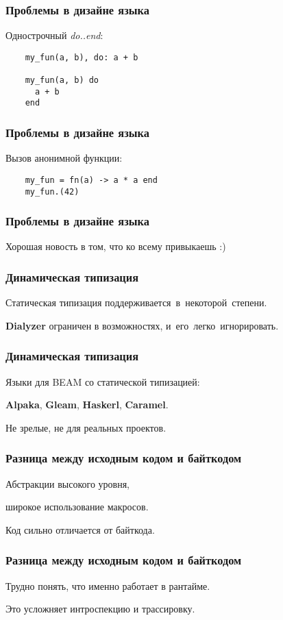 \documentclass[10pt,xcolor=x11names]{beamer}
\begin{document}
\begin{frame}[fragile]
  \frametitle{Проблемы в дизайне языка}
  Однострочный \textit{do..end}:
  \begin{lstlisting}
    my_fun(a, b), do: a + b
    
    my_fun(a, b) do
      a + b
    end
  \end{lstlisting}
\end{frame}

\begin{frame}[fragile]
  \frametitle{Проблемы в дизайне языка}
  Вызов анонимной функции:
  \begin{lstlisting}
    my_fun = fn(a) -> a * a end 
    my_fun.(42)
  \end{lstlisting}
\end{frame}

\begin{frame}
  \frametitle{Проблемы в дизайне языка}
  Хорошая новость в том, что ко всему привыкаешь :)
\end{frame}

\begin{frame}
  \frametitle{Динамическая типизация}
  Статическая типизация поддерживается~в~некоторой~степени.
  \par \bigskip
  \textbf{Dialyzer} ограничен в возможностях, и~его~легко~игнорировать.
\end{frame}

\begin{frame}
  \frametitle{Динамическая типизация}
  Языки для BEAM со статической типизацией:
  \par \bigskip
  \textbf{Alpaka}, \textbf{Gleam}, \textbf{Haskerl}, \textbf{Caramel}.
  \par \bigskip
  Не зрелые, не для реальных проектов.
\end{frame}

\begin{frame}
  \frametitle{Разница между исходным кодом и байткодом}
  Абстракции высокого уровня,
  \par \bigskip
  широкое использование макросов.
  \par \bigskip
  Код сильно отличается от байткода.
\end{frame}

\begin{frame}
  \frametitle{Разница между исходным кодом и байткодом}
  Трудно понять, что именно работает в рантайме.
  \par \bigskip
  Это усложняет интроспекцию и трассировку.
\end{frame}
\end{document}
